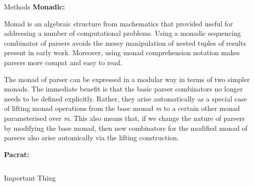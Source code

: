 \documentclass[final]{beamer}
\newlength{\onecolwid}
\newlength{\twocolwid}
\begin{document}
\begin{frame}[t]
\begin{columns}[t]
\begin{column}{\twocolwid}
\begin{columns}[t,totalwidth=\twocolwid]
\begin{column}{\onecolwid}
\begin{block}{Methods}
\textbf{Monadic:}

Monad is an algebraic structure from machematics that provided useful for addressing a
number of computational problems. Using a monadic sequencing combinator of parsers avoids
the messy manipulation of nested tuples of results present in early work. Moreover, using
monad comprehension notation makes parsers more compat and easy to read.

The monad of parser can be expressed in a modular way in terms of two simpler monads. The
immediate benefit is that the basic parser combinators no longer needs to be defined
explicitly. Rather, they arise automatically as a special case of lifting monad operations
from the base monad \textit{m} to a certain other monad parameterised over \textit{m}. This
also means that, if we change the nature of parsers by modifying the base monad, then new
combinators for the modified monad of parsers also arise automically via the lifting
construction.

\textbf{Pacrat:}

\end{block}


\end{column} %

\end{columns} %


\begin{alertblock}{Important Thing}


\end{alertblock}


\begin{columns}[t,totalwidth=\twocolwid] %

\begin{column}{\onecolwid} %



\end{column}
\end{columns}
\end{column}
\end{columns}
\end{frame}
\end{document}
